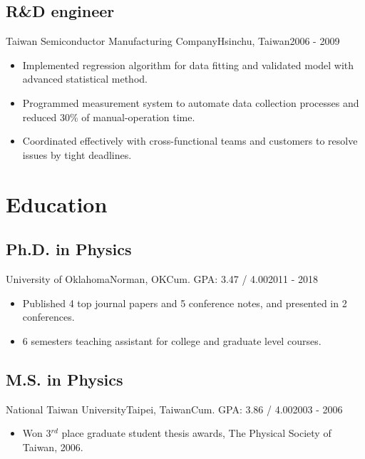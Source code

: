 \documentclass[11pt, letterpaper]{yt_resume}   	%
\begin{document}
\subsection{R\&D engineer}{Taiwan Semiconductor Manufacturing Company}{Hsinchu, Taiwan}{2006 - 2009}
\begin{itemize}
\item Implemented regression algorithm for data fitting and validated model with advanced statistical method.
\item Programmed measurement system to automate data collection processes and reduced 30\% of manual-operation time.
\item Coordinated effectively with cross-functional teams and customers to resolve issues by tight deadlines.
\end{itemize}



\section{Education}

\subsection{Ph.D. in Physics}{University of Oklahoma}{Norman, OK}{Cum. GPA: 3.47 / 4.00}{2011 - 2018}
\begin{itemize}
\item Published 4 top journal papers and 5 conference notes, and presented in 2 conferences.
\item 6 semesters teaching assistant for college and graduate level courses.
\end{itemize}

\subsection{M.S. in Physics}{National Taiwan University}{Taipei, Taiwan}{Cum. GPA: 3.86 / 4.00}{2003 - 2006}
\begin{itemize}
\item Won 3$^{rd}$ place graduate student thesis awards, The Physical Society of Taiwan, 2006.
\end{itemize}
\end{document}

